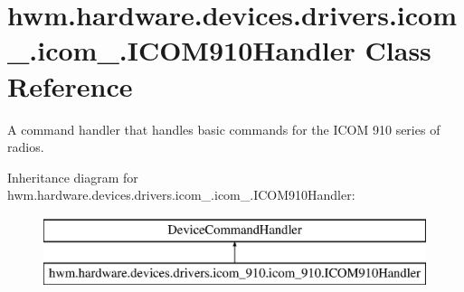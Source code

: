 \hypertarget{classhwm_1_1hardware_1_1devices_1_1drivers_1_1icom__910_1_1icom__910_1_1_i_c_o_m910_handler}{\section{hwm.\-hardware.\-devices.\-drivers.\-icom\-\_.\-icom\-\_.\-I\-C\-O\-M910\-Handler Class Reference}
\label{classhwm_1_1hardware_1_1devices_1_1drivers_1_1icom__910_1_1icom__910_1_1_i_c_o_m910_handler}
}


A command handler that handles basic commands for the I\-C\-O\-M 910 series of radios.  


Inheritance diagram for hwm.\-hardware.\-devices.\-drivers.\-icom\-\_.\-icom\-\_.\-I\-C\-O\-M910\-Handler\-:\begin{figure}[H]
\begin{center}
\leavevmode
\includegraphics[height=2.000000cm]{classhwm_1_1hardware_1_1devices_1_1drivers_1_1icom__910_1_1icom__910_1_1_i_c_o_m910_handler}
\end{center}
\end{figure}

